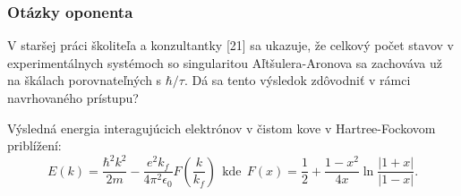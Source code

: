 \documentclass[
	11pt, %
]{beamer}
\begin{document}
\begin{frame}
\frametitle{Otázky oponenta}
 V staršej práci školiteľa a konzultantky [21] sa ukazuje, že celkový počet stavov v
experimentálnych systémoch so singularitou Aľtšulera-Aronova sa zachováva už na
škálach porovnateľných s $\hbar/\tau$. Dá sa tento výsledok zdôvodniť v rámci navrhovaného
prístupu?
\end{frame}

\begin{frame}

\end{frame}
\begin{frame}
Výsledná energia interagujúcich elektrónov v čistom kove v Hartree-Fockovom priblížení:
\begin{equation}
\label{eq:fock_erg}
E(k)=\frac{\hbar^2 k^2}{2m}- \frac{e^2 k_f}{4\pi^2\epsilon_0} F(\frac{k}{k_f})\ \ \text{kde}\ \ F(x)=\frac{1}{2}+\frac{1-x^2}{4x}\ln{\frac{|1+x|}{|1-x|}} \text{.}
\end{equation}


\end{frame}
\end{document}
